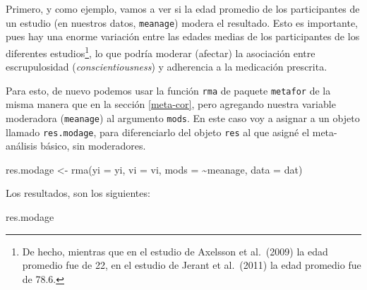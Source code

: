 \documentclass[
  bookmarksnumbered]{article}
\newenvironment{Shaded}{\begin{snugshade}}{\end{snugshade}}
\newcommand{\AttributeTok}[1]{\textcolor[rgb]{0.00,0.34,0.68}{#1}}
\newcommand{\FunctionTok}[1]{\textcolor[rgb]{0.39,0.29,0.61}{#1}}
\newcommand{\NormalTok}[1]{\textcolor[rgb]{0.12,0.11,0.11}{#1}}
\newcommand{\OtherTok}[1]{\textcolor[rgb]{0.00,0.43,0.16}{#1}}
\newcommand{\SpecialCharTok}[1]{\textcolor[rgb]{0.24,0.68,0.91}{#1}}
\begin{document}
Primero, y como ejemplo, vamos a ver si la edad promedio de los participantes de un estudio (en nuestros datos, \texttt{meanage}) modera el resultado. Esto es importante, pues hay una enorme variación entre las edades medias de los participantes de los diferentes estudios\footnote{De hecho, mientras que en el estudio de Axelsson et al.~(2009) la edad promedio fue de 22, en el estudio de Jerant et al.~(2011) la edad promedio fue de 78.6.}, lo que podría moderar (afectar) la asociación entre escrupulosidad (\emph{conscientiousness}) y adherencia a la medicación prescrita.

Para esto, de nuevo podemos usar la función \texttt{rma} de paquete \texttt{metafor} de la misma manera que en la sección \ref{meta-cor}, pero agregando nuestra variable moderadora (\texttt{meanage}) al argumento \texttt{mods}. En este caso voy a asignar a un objeto llamado \texttt{res.modage}, para diferenciarlo del objeto \texttt{res} al que asigné el meta-análisis básico, sin moderadores.

\begin{Shaded}
\begin{Highlighting}[]
\NormalTok{res.modage }\OtherTok{\textless{}{-}} \FunctionTok{rma}\NormalTok{(}\AttributeTok{yi =}\NormalTok{ yi, }\AttributeTok{vi =}\NormalTok{ vi, }\AttributeTok{mods =} \SpecialCharTok{\textasciitilde{}}\NormalTok{meanage, }\AttributeTok{data =}\NormalTok{ dat)}
\end{Highlighting}
\end{Shaded}

Los resultados, son los siguientes:

\begin{Shaded}
\begin{Highlighting}[]
\NormalTok{res.modage}
\end{Highlighting}
\end{Shaded}
\end{document}
